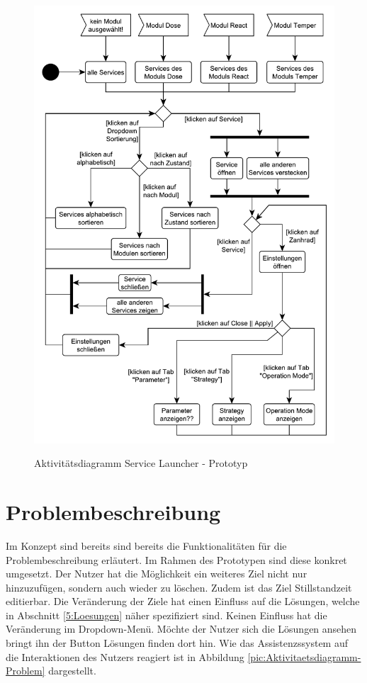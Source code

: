 \begin{figure}[htbp]
\centering
\includegraphics[scale=0.65]{DA_files/UML/Prototyp/Aktivitaetsdiagramm-ServiceLauchner.pdf}
\label{pic:Aktivitaetsdiagramm-ServiceLauncher}
\caption{Aktivitätsdiagramm Service Launcher - Prototyp}
\end{figure}

\section{Problembeschreibung}
Im Konzept sind bereits sind bereits die Funktionalitäten für die Problembeschreibung erläutert. Im Rahmen des Prototypen sind diese konkret umgesetzt. Der Nutzer hat die Möglichkeit ein weiteres Ziel nicht nur hinzuzufügen, sondern auch wieder zu löschen. Zudem ist das Ziel Stillstandzeit editierbar. Die Veränderung der Ziele hat einen Einfluss auf die Lösungen, welche in Abschnitt \ref{5:Loesungen} näher spezifiziert sind. Keinen Einfluss hat die Veränderung im Dropdown-Menü. Möchte der Nutzer sich die Lösungen ansehen bringt ihn der Button Lösungen finden dort hin. Wie das Assistenzssystem auf die Interaktionen des Nutzers reagiert ist in Abbildung \ref{pic:Aktivitaetsdiagramm-Problem} dargestellt.

